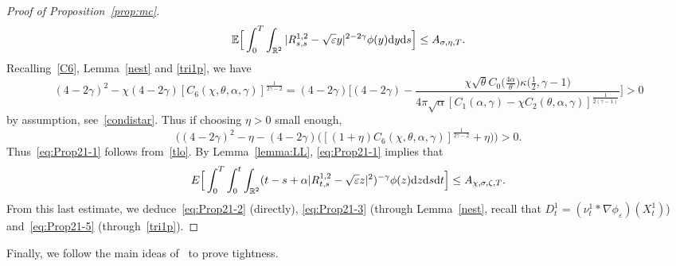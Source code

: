 \documentclass[11pt]{article}
\newcommand{\E}{\mathbb{E}}
\newcommand{\R}{\mathbb{R}}
\newcommand{\1}{\mathbbm{1}}
\newcommand{\dd}{{\rm d}}
\newcommand{\e}{\varepsilon}
\newcommand{\vip}{\vskip5pt}
\begin{document}
\begin{proof}[Proof of Proposition~\ref{prop:mc}]
\begin{align}
\E \Big[\int_0^T \int_{\R^2}  |R^{1,2}_{s,s}-\sqrt{\e}y|^{2-2\gamma} \phi(y) \dd y\dd s \Big] \leq A_{\sigma,\eta,T}. \label{tlo}
\end{align}
Recalling~\eqref{C6}, Lemma~\ref{nest} and \eqref{tri1p}, we have
$$
(4-2\gamma)^2 -\chi(4-2\gamma) [C_6(\chi,\theta,\alpha,\gamma)]^{\frac 1{2\gamma-2}}=
(4-2\gamma)\Big[(4-2\gamma)-\frac{\chi\sqrt{\theta} C_0\big(\frac{4\alpha}{\theta}\big) 
\kappa\big(\frac{1}{2}, \gamma-1\big)}{4\pi\sqrt{\alpha}[C_1(\alpha,\gamma) 
-\chi C_2(\theta,\alpha,\gamma)]^{\frac 1{2(\gamma-1)}}}\Big]
>0
$$
by assumption, see~\eqref{condistar}. Thus if choosing $\eta>0$ small enough,
$$
\Big((4-2\gamma)^2 - \eta-(4-2\gamma) \Big([(1+\eta) C_6(\chi,\theta,\alpha,\gamma)]^{\frac 1{2\gamma-2}}+\eta\Big) 
\Big)>0.
$$
Thus~\eqref{eq:Prop21-1} follows from~\eqref{tlo}.
\vip
By Lemma~\ref{lemma:LL}, \eqref{eq:Prop21-1} implies that 
$$
E\Big[\int_0^T \int_0^t \int_{\R^2}(t-s+\alpha|R^{1,2}_{t,s}-\sqrt\e z|^2)^{-\gamma} \phi(z)\dd z\dd s\dd t\Big]\leq A_{\chi,\sigma,\zeta,T}.
$$
From this last estimate, we deduce~\eqref{eq:Prop21-2} (directly), \eqref{eq:Prop21-3} 
(through Lemma~\ref{nest}, recall that $D^1_t=(\nu_t^1\ast\nabla \phi_\e)(X^1_t)$) 
and~\eqref{eq:Prop21-5} (through~\eqref{tri1p}).
\end{proof}

Finally, we follow the main ideas of~\cite[Lemma~11]{fournier-jourdain} to prove tightness.
\end{document}
